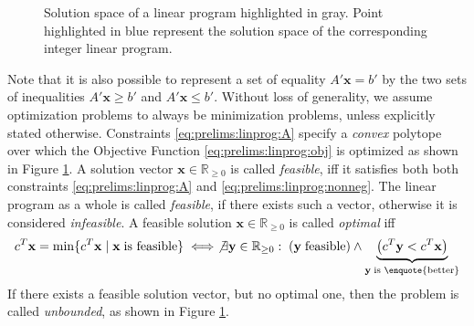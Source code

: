 \begin{figure}[ht!]
\begin{minipage}{0.45\textwidth}
			\end{minipage}
			\caption{Solution space of a linear program highlighted in gray. Point highlighted in blue represent the solution space of the corresponding integer linear program.}
			\label{fig:prelims:linear:solspace:unbounded}
		\end{figure}

		Note that it is also possible to represent a set of equality $A' \mathbf{x} = b'$ by the two sets of inequalities $A' \mathbf{x} \geq b'$ and $A' \mathbf{x} \leq b'$.
		Without loss of generality, we assume optimization problems to always be minimization problems, unless explicitly stated otherwise.
		Constraints \ref{eq:prelims:linprog:A} specify a \textit{convex} polytope over which the Objective Function \ref{eq:prelims:linprog:obj} is optimized as shown in Figure \ref{fig:prelims:linear:solspace:unbounded}. A solution vector $\mathbf{x} \in \mathbb{R}_{\geq 0}$ is called \textit{feasible}, iff it satisfies both both constraints \ref{eq:prelims:linprog:A} and \ref{eq:prelims:linprog:nonneg}.
		The linear program as a whole is called \textit{feasible}, if there exists such a vector, otherwise it is considered \textit{infeasible}.
		A feasible solution $\mathbf{x} \in \mathbb{R}_{\geq 0}$ is called \textit{optimal} iff
		\begin{equation*}
			c^T \mathbf{x} = \min \{ c^T \mathbf{x} \mid \mathbf{x} \; \text{is feasible} \} \iff \not\exists \mathbf{y} \in \mathbb{R}_{\geq 0}: \; \left(\mathbf{y} \; \text{feasible}\right) \land \underbrace{\left(c^T \mathbf{y} < c^T \mathbf{x}\right)}_{\mathbf{y} \; \text{is \enquote{better}}}
		\end{equation*}
		If there exists a feasible solution vector, but no optimal one, then the problem is called \textit{unbounded}, as shown in Figure \ref{fig:prelims:linear:solspace:unbounded}.

